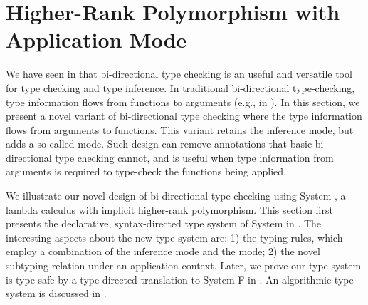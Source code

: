 \chapter{Higher-Rank Polymorphism with Application Mode}
\label{chap:BiDirectional}

We have seen in  that bi-directional type checking is an useful and
versatile tool for type checking and type inference. In traditional
bi-directional type-checking, type information flows from functions to arguments
(e.g.,  in ). In this section, we
present a novel variant of bi-directional type checking where the type
information flows from arguments to functions. This variant retains the
inference mode, but adds a so-called \textit{\mode} mode. Such design can remove
annotations that basic bi-directional type checking cannot, and is useful when
type information from arguments is required to type-check the functions being
applied.

We illustrate our novel design of bi-directional type-checking using System \ap,
a lambda calculus with implicit higher-rank polymorphism. This section first
presents the declarative, syntax-directed type system of System \ap
in . The interesting aspects about the new type system
are: 1) the typing rules, which employ a combination of the inference mode and
the \textit{\mode} mode; 2) the novel subtyping relation under an application
context. Later, we prove our type system is type-safe by a type directed
translation to System F in . An algorithmic type system
is discussed in .











